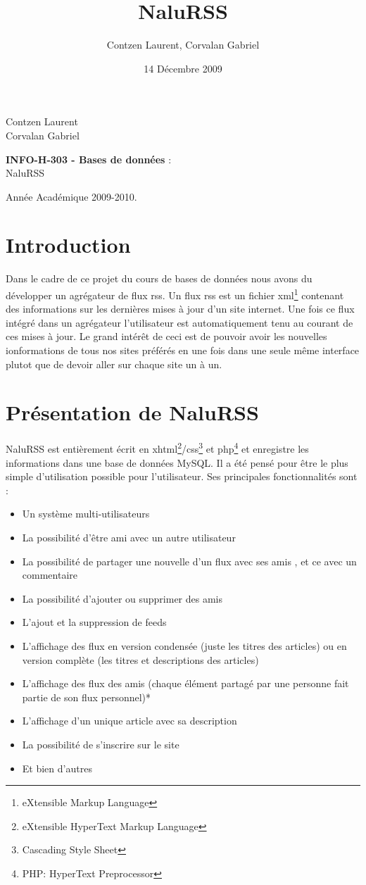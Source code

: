 \documentclass[11pt]{article}
\author{Contzen Laurent, Corvalan Gabriel}
\title{NaluRSS}
\date{14 Décembre 2009}
\begin{document}
\begin{titlepage}
\begin{flushleft}
Contzen Laurent \\
Corvalan Gabriel \\
\end{flushleft}
\begin{center}
\vspace{65mm}\LARGE{\textbf{INFO-H-303 - Bases de données} :\\
NaluRSS}
\end{center}
\begin{flushright}
\vspace{70mm}
Année Académique 2009-2010.
\end{flushright}
\end{titlepage}
\tableofcontents
\newpage

\section{Introduction}
Dans le cadre de ce projet du cours de bases de données nous avons du développer un agrégateur de flux rss. Un flux rss est un fichier xml\footnote{eXtensible Markup Language} contenant des informations sur les dernières mises à jour d'un site internet. Une fois ce flux intégré dans un agrégateur l'utilisateur est automatiquement tenu au courant de ces mises à jour. Le grand intérêt de ceci est de pouvoir avoir les nouvelles ionformations de tous nos sites préférés en une fois dans une seule même interface plutot que de devoir aller sur chaque site un à un.
\section{Présentation de NaluRSS}
NaluRSS est entièrement écrit en xhtml\footnote{eXtensible HyperText Markup Language}/css\footnote{Cascading Style Sheet} et php\footnote{PHP: HyperText Preprocessor} et enregistre les informations dans une base de données MySQL. Il a été pensé pour être le plus simple d'utilisation possible pour l'utilisateur. Ses principales fonctionnalités sont :
\begin{itemize}
\item{Un système multi-utilisateurs}
\item{La possibilité d'être \og ami \fg avec un autre utilisateur}
\item{La possibilité de partager une nouvelle d'un flux avec ses \og amis \fg, et ce avec un commentaire}
\item{La possibilité d'ajouter ou supprimer des \og amis \fg}
\item{L'ajout et la suppression de feeds}
\item{L'affichage des flux en version condensée (juste les titres des articles) ou en version complète (les titres et descriptions des articles)}
\item{L'affichage des flux des \og amis \fg (chaque élément partagé par une personne fait partie de son flux personnel)}*
\item{L'affichage d'un unique article avec sa description}
\item{La possibilité de s'inscrire sur le site}
\item{Et bien d'autres}
\end{itemize}
\end{document}
